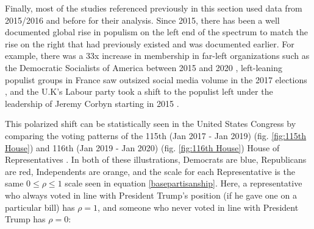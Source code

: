 \documentclass[preprint,review,12pt]{elsarticle}
\begin{document}
Finally, most of the studies referenced previously in this section used data from 2015/2016 and before for their analysis. Since 2015, there has been a well documented global rise in populism on the left end of the spectrum to match the rise on the right that had previously existed and was documented earlier. For example, there was a 33x increase in membership in far-left organizations such as the Democratic Socialists of America between 2015 and 2020 \cite{godfrey2020thousands}, left-leaning populist groups in France saw outsized social media volume in the 2017 elections \cite{donadio2017french}, and the U.K's Labour party took a shift to the populist left under the leadership of Jeremy Corbyn starting in 2015 \cite{wainwright2018remarkable,hobson_fielding_2019}. 

This polarized shift can be statistically seen in the United States Congress by comparing the voting patterns of the 115th (Jan 2017 - Jan 2019) (fig. \ref{fig:115th House}) and 116th (Jan 2019 - Jan 2020) (fig. \ref{fig:116th House}) House of Representatives \cite{fivethirtyeight2018tracking}. In both of these illustrations, Democrats are blue, Republicans are red, Independents are orange, and the scale for each Representative is the same $0\leq \rho \leq 1$ scale seen in equation \ref{basepartisanship}. Here, a representative who always voted in line with President Trump's position (if he gave one on a particular bill) has $\rho = 1$, and someone who never voted in line with President Trump has $\rho = 0$:
\end{document}
